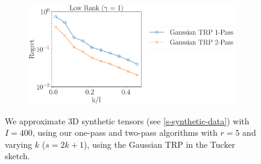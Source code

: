 \begin{figure}
\begin{subfigure}{0.55\textwidth}
		\includegraphics[scale = 0.24]{figure/fig3_lk_hnoise_400.pdf}
	\end{subfigure}
	\caption{We approximate 3D synthetic tensors (see \ref{s-synthetic-data}) with $I = 400$,
		using our one-pass and two-pass algorithms with $r = 5$ and varying $k$ ($s = 2k+1$),
		using the Gaussian TRP in the Tucker sketch.}\label{fig:vary-k-400-compare-app}
\end{figure}



